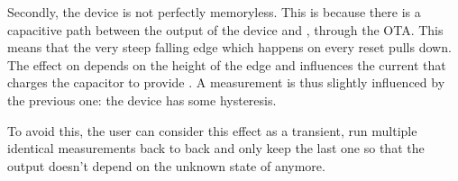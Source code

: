 Secondly, the device is not perfectly memoryless.
This is because there is a capacitive path between the output of the device and , through the OTA.
This means that the very steep falling edge which happens on every reset pulls  down.
The effect on  depends on the height of the edge and influences the current that charges the capacitor to provide .
A measurement is thus slightly influenced by the previous one: the device has some hysteresis.

To avoid this, the user can consider this effect as a transient, run multiple identical measurements back to back and only keep the last one so that the output doesn't depend on the unknown state of  anymore.
